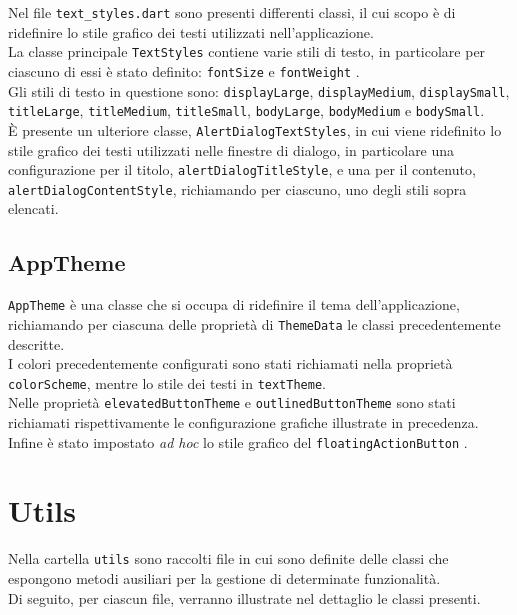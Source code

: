 Nel file \lstinline{text_styles.dart} sono presenti differenti classi, il cui scopo è di ridefinire lo stile grafico dei testi utilizzati nell'applicazione. \\
La classe principale \lstinline{TextStyles} contiene varie stili di testo, in particolare per ciascuno di essi è stato definito: \lstinline{fontSize} \cite{site:font-size} e \lstinline{fontWeight} \cite{site:font-weight}. \\
Gli stili di testo \cite{site:text-theme} in questione sono:
 \lstinline{displayLarge},
 \lstinline{displayMedium},
 \lstinline{displaySmall},
 \lstinline{titleLarge},
 \lstinline{titleMedium},
 \lstinline{titleSmall},
 \lstinline{bodyLarge},
 \lstinline{bodyMedium} e
 \lstinline{bodySmall}. \\
 È presente un ulteriore classe, \lstinline{AlertDialogTextStyles}, in cui viene ridefinito lo stile grafico dei testi utilizzati nelle finestre di dialogo, in particolare una configurazione per il titolo, \lstinline{alertDialogTitleStyle}, e una per il contenuto, \lstinline{alertDialogContentStyle}, richiamando per ciascuno, uno degli stili sopra elencati.

 \subsection{AppTheme}
\label{subsec:app-theme}

\lstinline{AppTheme} è una classe che si occupa di ridefinire il tema dell'applicazione, richiamando per ciascuna delle proprietà di \lstinline{ThemeData} \cite{site:theme-data-class} le classi precedentemente descritte. \\
I colori precedentemente configurati sono stati richiamati nella proprietà \lstinline{colorScheme}, mentre lo stile dei testi in \lstinline{textTheme}. \\
Nelle proprietà \lstinline{elevatedButtonTheme} e \lstinline{outlinedButtonTheme} sono stati richiamati rispettivamente le configurazione grafiche illustrate in precedenza.\\
Infine è stato impostato \emph{ad hoc} lo stile grafico del \lstinline{floatingActionButton} \cite{site:fab}.

\section{Utils}
\label{sec:utils}

Nella cartella \lstinline{utils} sono raccolti file in cui sono definite delle classi che espongono metodi ausiliari per la gestione di determinate funzionalità. \\
Di seguito, per ciascun file, verranno illustrate nel dettaglio le classi presenti.


